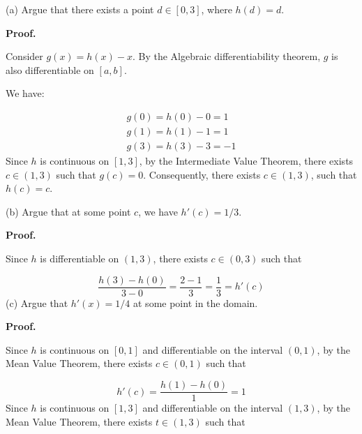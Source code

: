 \documentclass[10pt]{article}
\begin{document}
(a) Argue that there exists a point $\displaystyle d\in [ 0,3]$, where $\displaystyle h( d) =d$.



\textbf{Proof.}



Consider $\displaystyle g( x) =h( x) -x$. By the Algebraic differentiability theorem, $\displaystyle g$ is also differentiable on $\displaystyle [ a,b]$. 



We have:


\begin{gather*}
g( 0) =h( 0) -0=1\\
g( 1) =h( 1) -1=1\\
g( 3) =h( 3) -3=-1
\end{gather*}
Since $\displaystyle h$ is continuous on $\displaystyle [ 1,3]$, by the Intermediate Value Theorem, there exists $\displaystyle c\in ( 1,3)$ such that $\displaystyle g( c) =0$. Consequently, there exists $\displaystyle c\in ( 1,3)$, such that $\displaystyle h( c) =c$.



(b) Argue that at some point $\displaystyle c$, we have $\displaystyle h'( c) =1/3$. 



\textbf{Proof.}



Since $\displaystyle h$ is differentiable on $\displaystyle ( 1,3)$, there exists $\displaystyle c\in ( 0,3)$ such that 


\begin{equation*}
\frac{h( 3) -h( 0)}{3-0} =\frac{2-1}{3} =\frac{1}{3} =h'( c)
\end{equation*}
(c) Argue that $\displaystyle h'( x) =1/4$ at some point in the domain.



\textbf{Proof.}



Since $\displaystyle h$ is continuous on $\displaystyle [ 0,1]$ and differentiable on the interval $\displaystyle ( 0,1)$, by the Mean Value Theorem, there exists $\displaystyle c\in ( 0,1)$ such that




\begin{equation*}
h'( c) =\frac{h( 1) -h( 0)}{1} =1
\end{equation*}
Since $\displaystyle h$ is continuous on $\displaystyle [ 1,3]$ and differentiable on the interval $\displaystyle ( 1,3)$, by the Mean Value Theorem, there exists $\displaystyle t\in ( 1,3)$ such that 
\end{document}
